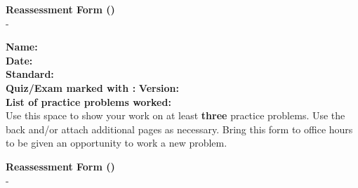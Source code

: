 \documentclass[letterpaper]{article}
\begin{document}
\begin{center}
{\Large \bf Reassessment Form (\reattemptMark{})} \\
\large \course{} - \prof
\end{center}



\vspace{0.2in}

\begin{flushleft}
{\bf Name: } \underline{\phantom{xxxxxxxxxxxxxxxxxxxxxxxxxxxxxxxxxxxxxxxxxxxxxxxxxxxxxxxxx}} \\
\vspace{0.15in}
{\bf Date: } \underline{\phantom{xxxxxxxxxxxxxxxxxxxxxxxxxxxxxxxxxxxxxxxxxxxxxxxxxxxxxxxxx}} \\
\vspace{0.15in}
{\bf Standard: } \underline{\phantom{xxxxxxxxxxxxxxxxxxx}} \\
\vspace{0.15in}
{\bf Quiz/Exam marked with \reattemptMark{}: } \underline{\phantom{xxxxxxxxxx}}
{\bf Version: } \underline{\phantom{xxxxxx}} \\
\vspace{0.15in}
{\bf List of practice problems worked: } \\
\vspace{0.4in}
Use this space to show your work on at least {\bf three} practice problems.  Use the back and/or attach additional pages as necessary. Bring this form
to office hours to be given an opportunity to work a new problem.

\vfill


\end{flushleft}

\newpage

\begin{center}
{\Large \bf Reassessment Form (\minorMark{})} \\
\large \course{} - \prof
\end{center}



\vspace{0.2in}
\end{document}
